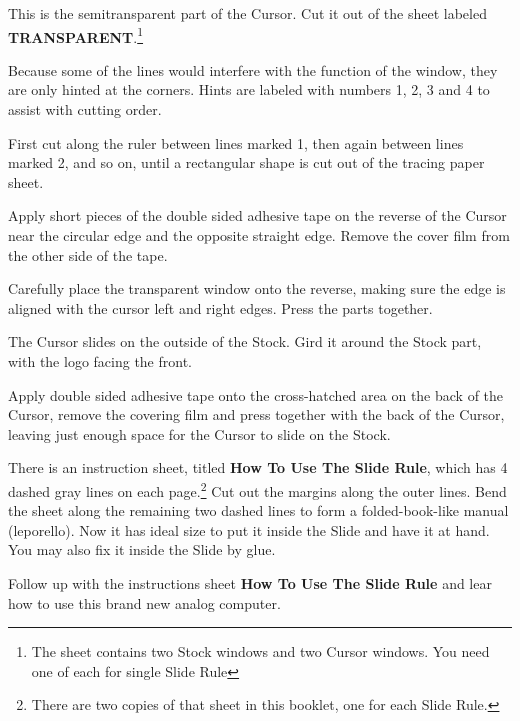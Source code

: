 \begin{multicols*}{3}
{  

\footnotesize This is the semitransparent part of the Cursor. Cut it out of the sheet labeled \textbf{TRANSPARENT}.\footnote{The sheet contains two Stock windows and two Cursor windows. You need one of each for single Slide Rule}\normalsize

Because some of the lines would interfere with the function of the window, they are only hinted at the corners. Hints are labeled with numbers 1, 2, 3 and 4 to assist with cutting order.

First cut along the ruler between lines marked 1, then again between lines marked 2, and so on, until a rectangular shape is cut out of the tracing paper sheet.

Apply short pieces of the double sided adhesive tape on the reverse of the Cursor near the circular edge and the opposite straight edge. Remove the cover film from the other side of the tape.

Carefully place the transparent window onto the reverse, making sure the edge is aligned with the cursor left and right edges. Press the parts together.


The Cursor slides on the outside of the Stock. Gird it around the Stock part, with the logo facing the front.

Apply double sided adhesive tape onto the cross-hatched area on the back of the Cursor, remove the covering film and press together with the back of the Cursor, leaving just enough space for the Cursor to slide on the Stock.


There is an instruction sheet, titled \textbf{How To Use The Slide Rule}, which has 4 dashed gray lines 
on each page.\footnote{There are two copies of that sheet in this booklet, one for each Slide Rule.} Cut out the margins along the outer lines. Bend the sheet along the remaining two dashed lines to form a folded-book-like manual (leporello). Now it has ideal size to put it inside the Slide and have it at hand. You may also fix it inside the Slide by glue.


Follow up with the instructions sheet \textbf{How To Use The Slide Rule} and lear how to use this brand new analog computer.

  }
  \end{multicols*}
  

